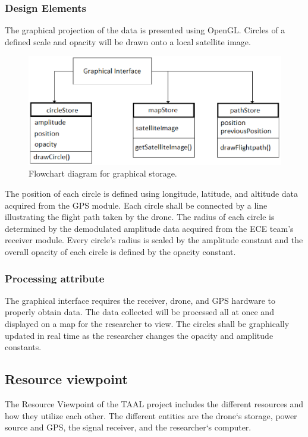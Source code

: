 \documentclass[onecolumn, draftclsnofoot,10pt, compsoc]{IEEEtran}
\begin{document}
\subsubsection{Design Elements}
The graphical projection of the data is presented using OpenGL.
Circles of a defined scale and opacity will be drawn onto a local satellite image. 

\begin{figure}[h]
\includegraphics[width=7in]{GraphicsFlowchart.eps}
\captionsetup{justification=centering}
\caption{Flowchart diagram for graphical storage.}
\centering
\end{figure}

The position of each circle is defined using longitude, latitude, and altitude data acquired from the GPS module.
Each circle shall be connected by a line illustrating the flight path taken by the drone.
The radius of each circle is determined by the demodulated amplitude data acquired from the ECE team's receiver module.
Every circle's radius is scaled by the amplitude constant and the overall opacity of each circle is defined by the opacity constant.

\subsubsection{Processing attribute}
The graphical interface requires the receiver, drone, and GPS hardware to properly obtain data. The data collected will be processed all at once and displayed on a map for the researcher to view. The circles shall be graphically updated in real time as the researcher changes the opacity and amplitude constants.

\subsection{Resource viewpoint}

The Resource Viewpoint of the TAAL project includes the different resources and how they utilize each other. The different entities are the drone`s storage, power source and GPS, the signal receiver, and the researcher`s computer.
\end{document}
